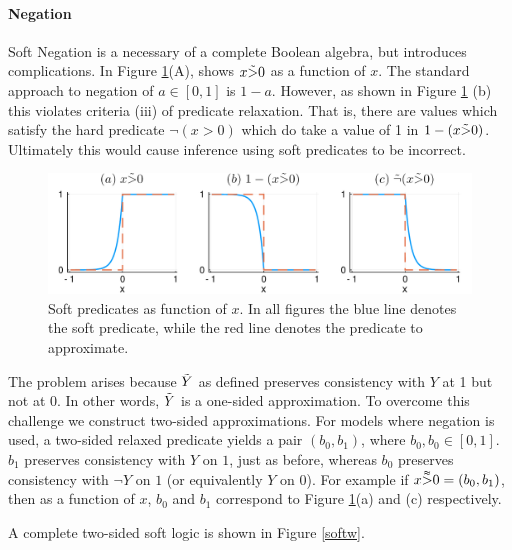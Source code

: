 \paragraph{Negation}
Soft Negation is a necessary of a complete Boolean algebra, but introduces complications.
In Figure \ref{negationimg}(A), shows $x \tilde{>} 0$ as a function of $x$.
The standard \cite{} approach to negation of $a \in [0, 1]$ is $1 - a$.
However, as shown in Figure \ref{negationimg} (b) this violates criteria (iii) of predicate relaxation.
That is, there are values which satisfy the hard predicate $\neg(x > 0)$ which do take a value of 1 in $1 - (x \tilde{>} 0)$.
Ultimately this would cause inference using soft predicates to be incorrect.

\begin{figure}
\includegraphics[width=\linewidth]{negation.pdf}
\caption{Soft predicates as function of $x$.  In all figures the blue line denotes the soft predicate, while the red line denotes the predicate to approximate.}\label{negationimg}
\end{figure}


The problem arises because $\tilde{Y}$ as defined preserves consistency with $Y$ at 1 but not at 0.
In other words, $\tilde{Y}$ is a one-sided approximation.
To overcome this challenge we construct two-sided approximations.
For models where negation is used, a two-sided relaxed predicate yields a pair $(b_0, b_1)$, where $b_0, b_0 \in [0, 1]$.
$b_1$ preserves consistency with $Y$ on $1$, just as before, whereas $b_0$ preserves consistency with $\neg Y$ on $1$ (or equivalently $Y$ on 0).
For example if $x \accentset{\approx}{>} 0 = (b_0, b_1)$, then as a function of $x$, $b_0$ and $b_1$ correspond to Figure \ref{negationimg}(a) and (c) respectively.

A complete two-sided soft logic is shown in Figure \ref{softw}.
 
